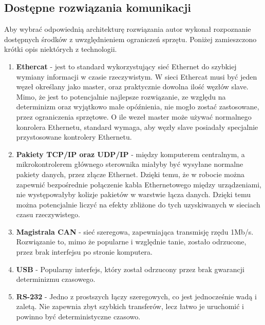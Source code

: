\documentclass[10pt,a4paper]{article}
\begin{document}
	\subsection{Dostępne rozwiązania komunikacji}
	Aby wybrać odpowiednią architekturę rozwiązania autor wykonał rozpoznanie dostępnych środków z uwzględnieniem ograniczeń sprzętu. Poniżej zamieszczono krótki opis niektórych z technologii.
	\begin{enumerate}
		\item \textbf{Ethercat} - jest to standard wykorzystujący sieć Ethernet do szybkiej wymiany informacji w czasie rzeczywistym. W sieci Ethercat musi być jeden węzeł określany jako master, oraz praktycznie dowolna ilość węzłów slave. Mimo, że jest to potencjalnie najlepsze rozwiązanie, ze względu na determinizm oraz wyjątkowo małe opóźnienia, nie mogło zostać zastosowane, przez ograniczenia sprzętowe. O ile wezeł master może używać normalnego konrolera Ethernetu, standard wymaga, aby węzły slave posiadały specjalnie przystosowane kontrolery Ethernetu.
		\item \textbf{Pakiety TCP/IP oraz UDP/IP} - między komputerem centralnym, a mikrokontrolerem głównego sterownika miałyby być wysyłane normalne pakiety danych, przez złącze Ethernet. Dzięki temu, że w robocie można zapewnić bezpośrednie połączenie kabla Ethernetowego między urządzeniami, nie występowałyby kolizje pakietów w warstwie łącza danych. Dzięki temu można potencjalnie liczyć na efekty zbliżone do tych uzyskiwanych w sieciach czasu rzeczywistego.
		\item \textbf{Magistrala CAN} - sieć szeregowa, zapewniająca transmisję rzędu 1Mb/s. Rozwiązanie to, mimo że popularne i względnie tanie, zostało odrzucone, przez brak interfejsu po stronie komputera.
		\item \textbf{USB} - Popularny interfejs, który został odrzucony przez brak gwarancji determinizmu czasowego.
		\item \textbf{RS-232} - Jedno z prostszych łączy szeregowych, co jest jednocześnie wadą i zaletą. Nie zapewnia zbyt szybkich transferów, lecz łatwo je uruchomić i powinno być deterministyczne czasowo.
	\end{enumerate} 
\end{document}
